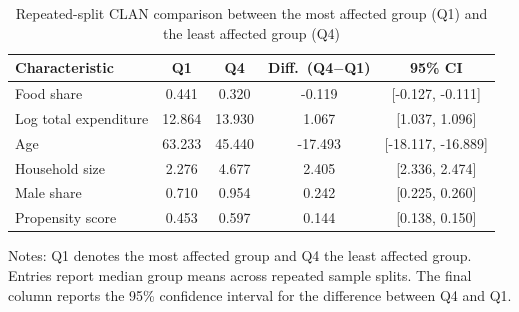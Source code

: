 \begin{table}[htbp]
\centering
\begin{threeparttable}
\caption{Repeated-split CLAN comparison between the most affected group (Q1) and the least affected group (Q4)}
\label{tab:clan_results}
\footnotesize
\begin{tabular*}{\textwidth}{@{\extracolsep{\fill}}lcccc@{}}
\toprule
Characteristic & Q1 & Q4 & Diff.\ (Q4$-$Q1) & 95\% CI \\
\midrule
Food share & 0.441 & 0.320 & -0.119 & [-0.127, -0.111] \\
Log total expenditure & 12.864 & 13.930 & 1.067 & [1.037, 1.096] \\
Age & 63.233 & 45.440 & -17.493 & [-18.117, -16.889] \\
Household size & 2.276 & 4.677 & 2.405 & [2.336, 2.474] \\
Male share & 0.710 & 0.954 & 0.242 & [0.225, 0.260] \\
Propensity score & 0.453 & 0.597 & 0.144 & [0.138, 0.150] \\
\bottomrule
\end{tabular*}
\begin{tablenotes}[flushleft]
\footnotesize
\item Notes: Q1 denotes the most affected group and Q4 the least affected group. Entries report median group means across repeated sample splits. The final column reports the 95\% confidence interval for the difference between Q4 and Q1.
\end{tablenotes}
\end{threeparttable}
\end{table}
